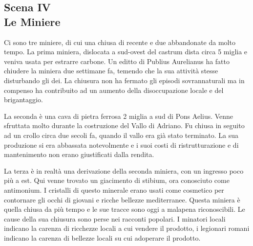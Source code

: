 \documentclass[11.5pt,twocolumn]{article}
\begin{document}


\subsection*{Scena IV\\Le Miniere}
%
Ci sono tre miniere, di cui una chiusa di recente e due abbandonate da molto tempo.
La prima miniera, dislocata a sud-ovest del castrum dista circa 5 miglia e veniva usata per estrarre carbone.
Un editto di Publius Aurelianus ha fatto chiudere la miniera due settimane fa, temendo che la sua attivit\`{a} stesse disturbando gli dei.
La chiusura non ha fermato gli episodi sovrannaturali ma in compenso ha contribuito ad un aumento della disoccupazione locale e del brigantaggio.

La seconda \`{e} una cava di pietra ferrosa 2 miglia a sud di Pons Aelius.
Venne sfruttata molto durante la costruzione del Vallo di Adriano.
Fu chiusa in seguito ad un crollo circa due secoli fa, quando il vallo era gi\`{a} stato terminato.
La sua produzione si era abbassata notevolmente e i suoi costi di ristrutturazione e di mantenimento non erano giustificati dalla rendita.

La terza \`{e} in realt\`{a} una derivazione della seconda miniera, con un ingresso poco pi\`{u} a est.
Qui venne trovato un giacimento di stibium, ora conosciuto come antimonium.
I cristalli di questo minerale erano usati come cosmetico per contornare gli occhi di giovani e ricche bellezze mediterranee.
Questa miniera \`{e} quella chiusa da pi\`{u} tempo e le sue tracce sono oggi a malapena riconoscibili.
Le cause della sua chiusura sono perse nei racconti popolari.
I minatori locali indicano la carenza di ricchezze locali a cui vendere il prodotto, i legionari romani indicano la carenza di bellezze locali su cui adoperare il prodotto.
\end{document}
